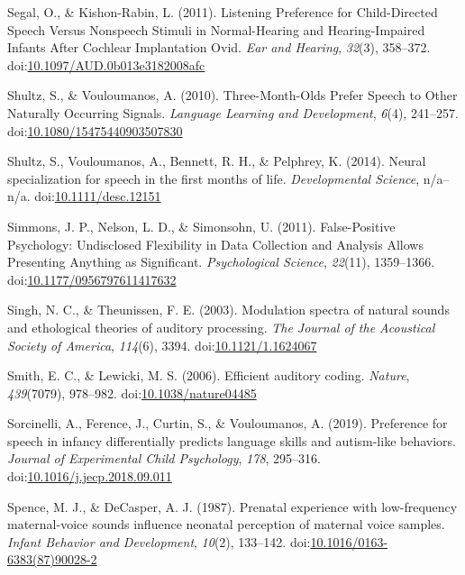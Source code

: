 \documentclass[man,floatsintext]{apa6}
\begin{document}
\hypertarget{ref-segal_listening_2011}{}
Segal, O., \& Kishon-Rabin, L. (2011). Listening Preference for
Child-Directed Speech Versus Nonspeech Stimuli in Normal-Hearing and
Hearing-Impaired Infants After Cochlear Implantation Ovid. \emph{Ear and
Hearing}, \emph{32}(3), 358--372.
doi:\href{https://doi.org/10.1097/AUD.0b013e3182008afc}{10.1097/AUD.0b013e3182008afc}

\hypertarget{ref-shultz_three-month-olds_2010}{}
Shultz, S., \& Vouloumanos, A. (2010). Three-Month-Olds Prefer Speech to
Other Naturally Occurring Signals. \emph{Language Learning and
Development}, \emph{6}(4), 241--257.
doi:\href{https://doi.org/10.1080/15475440903507830}{10.1080/15475440903507830}

\hypertarget{ref-shultz_neural_2014}{}
Shultz, S., Vouloumanos, A., Bennett, R. H., \& Pelphrey, K. (2014).
Neural specialization for speech in the first months of life.
\emph{Developmental Science}, n/a--n/a.
doi:\href{https://doi.org/10.1111/desc.12151}{10.1111/desc.12151}

\hypertarget{ref-simmons_false-positive_2011}{}
Simmons, J. P., Nelson, L. D., \& Simonsohn, U. (2011). False-Positive
Psychology: Undisclosed Flexibility in Data Collection and Analysis
Allows Presenting Anything as Significant. \emph{Psychological Science},
\emph{22}(11), 1359--1366.
doi:\href{https://doi.org/10.1177/0956797611417632}{10.1177/0956797611417632}

\hypertarget{ref-singh_modulation_2003}{}
Singh, N. C., \& Theunissen, F. E. (2003). Modulation spectra of natural
sounds and ethological theories of auditory processing. \emph{The
Journal of the Acoustical Society of America}, \emph{114}(6), 3394.
doi:\href{https://doi.org/10.1121/1.1624067}{10.1121/1.1624067}

\hypertarget{ref-smith_efficient_2006}{}
Smith, E. C., \& Lewicki, M. S. (2006). Efficient auditory coding.
\emph{Nature}, \emph{439}(7079), 978--982.
doi:\href{https://doi.org/10.1038/nature04485}{10.1038/nature04485}

\hypertarget{ref-sorcinelli_preference_2019}{}
Sorcinelli, A., Ference, J., Curtin, S., \& Vouloumanos, A. (2019).
Preference for speech in infancy differentially predicts language skills
and autism-like behaviors. \emph{Journal of Experimental Child
Psychology}, \emph{178}, 295--316.
doi:\href{https://doi.org/10.1016/j.jecp.2018.09.011}{10.1016/j.jecp.2018.09.011}

\hypertarget{ref-spence_prenatal_1987}{}
Spence, M. J., \& DeCasper, A. J. (1987). Prenatal experience with
low-frequency maternal-voice sounds influence neonatal perception of
maternal voice samples. \emph{Infant Behavior and Development},
\emph{10}(2), 133--142.
doi:\href{https://doi.org/10.1016/0163-6383(87)90028-2}{10.1016/0163-6383(87)90028-2}
\end{document}
